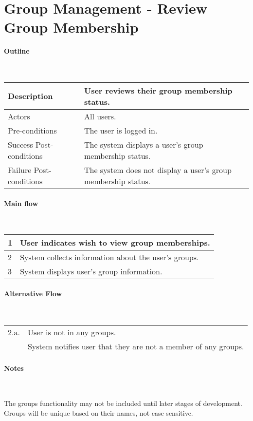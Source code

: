 \section*{Group Management - Review Group Membership} %

\paragraph*{Outline} \

\begin{tabular}{ | l | l | }
\hline
Description & User reviews their group membership status. \\ \hline
Actors & All users. \\ \hline
Pre-conditions & The user is logged in. \\ \hline
Success Post-conditions & The system displays a user's group membership status. \\ \hline
Failure Post-conditions & The system does not display a user's group membership status. \\ \hline
\end{tabular}


\paragraph*{Main flow} \

\begin{tabular}{ | l | l | } \hline
1 & User indicates wish to view group memberships. \\ \hline
2 & System collects information about the user's groups. \\ \hline
3 & System displays user's group information. \\ \hline
\end{tabular}


\paragraph*{Alternative Flow} \

\begin{tabular}{ | l | l | } \hline
2.a. & User is not in any groups. \\
     & System notifies user that they are not a member of any groups. \\ \hline
\end{tabular}

\paragraph*{Notes} \

The groups functionality may not be included until later stages of development. \\
Groups will be unique based on their names, not case sensitive.
